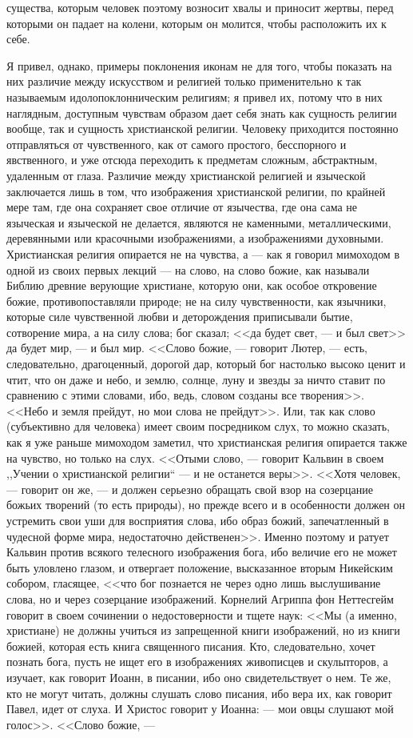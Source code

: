 \documentclass[12pt]{article}
\begin{document}
существа, которым человек поэтому возносит хвалы и приносит жертвы, перед которыми он падает на колени, которым он молится, чтобы расположить их к себе. 

Я привел, однако, примеры поклонения иконам не для того, чтобы показать на них различие между искусством и религией только применительно к так называемым идолопоклонническим религиям; я привел их, потому что в них наглядным, доступным чувствам образом дает себя знать как сущность религии вообще, так и сущность христианской религии. Человеку приходится постоянно отправляться от чувственного, как от самого простого, бесспорного и явственного, и уже отсюда переходить к предметам сложным, абстрактным, удаленным от глаза. Различие между христианской религией и языческой заключается лишь в том, что изображения христианской религии, по крайней мере там, где она сохраняет свое отличие от язычества, где она сама не языческая и языческой не делается, являются не каменными, металлическими, деревянными или красочными изображениями, а изображениями духовными. Христианская религия опирается не на чувства, а --- как я говорил мимоходом в одной из своих первых лекций --- на слово, на слово божие, как называли Библию древние верующие христиане, которую они, как особое откровение божие, противопоставляли природе; не на силу чувственности, как язычники, которые силе чувственной любви и деторождения приписывали бытие, сотворение мира, а на силу слова; бог сказал; <<да будет свет, --- и был свет>>  да будет мир, --- и был мир. <<Слово божие, --- говорит Лютер, --- есть, следовательно, драгоценный, дорогой дар, который бог настолько высоко ценит и чтит, что он даже и небо, и землю, солнце, луну и звезды за ничто ставит по сравнению с этими словами, ибо, ведь, словом созданы все творения>>. <<Небо и земля прейдут, но мои слова не прейдут>>. Или, так как слово (субъективно для человека) имеет своим посредником слух, то можно сказать, как я уже раньше мимоходом заметил, что христианская религия опирается также на чувство, но только на слух. <<Отыми слово, --- говорит Кальвин в своем ,,Учении о христианской религии``  --- и не останется веры>>. <<Хотя человек, --- говорит он же, --- и должен серьезно обращать свой взор на созерцание божьих творений (то есть природы), но прежде всего и в особенности должен он устремить свои уши для восприятия слова, ибо образ божий, запечатленный в чудесной форме мира, недостаточно действенен>>. Именно поэтому и ратует Кальвин против всякого телесного изображения бога, ибо величие его не может быть уловлено глазом, и отвергает положение, высказанное вторым Никейским собором, гласящее, <<что бог познается не через одно лишь выслушивание слова, но и через созерцание изображений. Корнелий Агриппа фон Неттесгейм говорит в своем сочинении о недостоверности и тщете наук: <<Мы (а именно, христиане) не должны учиться из запрещенной книги изображений, но из книги божией, которая есть книга священного писания. Кто, следовательно, хочет познать бога, пусть не ищет его в изображениях живописцев и скульпторов, а изучает, как говорит Иоанн, в писании, ибо оно свидетельствует о нем. Те же, кто не могут читать, должны слушать слово писания, ибо вера их, как говорит Павел, идет от слуха. И Христос говорит у Иоанна: --- мои овцы слушают мой голос>>. <<Слово божие, --- 
\end{document}
